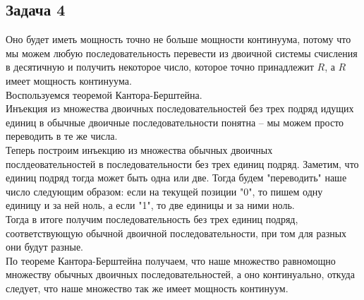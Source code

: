 	\subsection{Задача 4}
	Оно будет иметь мощность точно не больше мощности континуума, потому что мы можем любую последовательность перевести из двоичной системы счисления в десятичную и получить некоторое число, которое точно принадлежит $R$, а $R$ имеет мощность континуума. \\
	Воспользуемся теоремой Кантора-Берштейна. \\
	Инъекция из множества двоичных последовательностей без трех подряд идущих единиц в обычные двоичные последовательности понятна  -- мы можем просто переводить в те же числа. \\
	Теперь построим инъекцию  из множества обычных двоичных послдеовательностей в последовательности без трех единиц подряд. 
	Заметим, что единиц подряд тогда  может быть одна или две. Тогда будем "переводить" наше число следующим образом: если на текущей позиции "0", то пишем одну единицу и за ней ноль, а если "1", то две единицы и за ними ноль. \\
	Тогда в итоге получим последовательность без трех единиц подряд, соответствующую обычной двоичной последовательности, при том для разных они будут разные. \\
	По теореме Кантора-Берштейна получаем, что наше множество равномощно множеству обычных двоичных последовательностей, а оно континуально, откуда следует, что наше множество так же имеет мощность континуум. 
	
